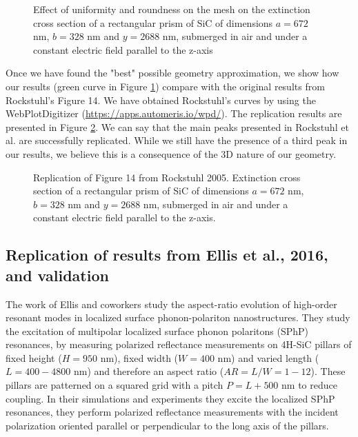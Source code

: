 \begin{figure}
    \centering
    \caption{ Effect of uniformity and roundness on the mesh on the 
    extinction cross section of a rectangular prism of SiC of dimensions $a=672$ nm, 
    $b=328$ nm and $y=2688$ nm, submerged in air and under a constant electric field 
    parallel to the z-axis}
    \label{fig:tri_reg_round_14}
 \end{figure}

Once we have found the "best" possible geometry approximation, we show how our results 
(green curve in Figure \ref{fig:tri_reg_round_14}) compare 
with the original results from Rockstuhl's Figure 14. We have obtained Rockstuhl's curves by using 
the WebPlotDigitizer (\url{https://apps.automeris.io/wpd/}). The replication results are 
presented in Figure \ref{fig:rep_14}. We can say that the main peaks presented in Rockstuhl et al. are 
successfully replicated. While we still have the presence of a third peak in our results, we believe 
this is a consequence of the 3D nature of our geometry.

 \begin{figure}
    \centering
    \caption{Replication of Figure 14 from Rockstuhl 2005. Extinction cross section of a
    rectangular prism of SiC of dimensions $a=672$ nm, $b=328$ nm and $y=2688$ nm, submerged
    in air and under a constant electric field parallel to the z-axis.}
    \label{fig:rep_14}
 \end{figure}


 \subsection{Replication of results from Ellis et al., 2016, and validation}

The work of Ellis and coworkers \cite{ellis2016} study the aspect-ratio evolution of high-order
resonant modes in localized surface phonon-polariton nanostructures. They study the
excitation of multipolar localized surface phonon polaritons (SPhP) resonances, by measuring
polarized reflectance measurements on 4H-SiC pillars of fixed height ($H=950$ nm), fixed 
width ($W=400$ nm) and varied length ($L=400-4800$ nm) and therefore an aspect ratio
($AR=L/W=1-12$). These pillars are patterned on a squared grid with a pitch $P=L+500$ nm
to reduce coupling. In their simulations and experiments they excite the localized SPhP
resonances, they perform polarized reflectance measurements with the incident polarization 
oriented parallel or perpendicular to the long axis of the pillars.  

